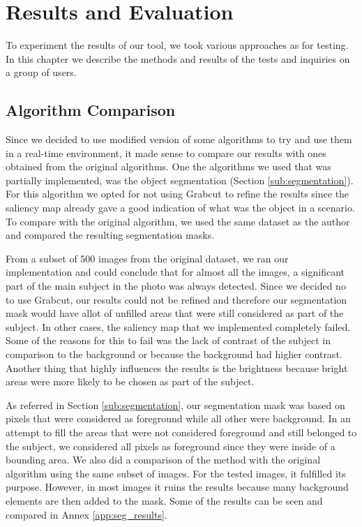 \chapter{Results and Evaluation}
\label{cha:results}

To experiment the results of our tool, we took various approaches as for testing. In this chapter we describe the methods and results of the tests and inquiries on a group of users.

\section{Algorithm Comparison}

Since we decided to use modified version of some algorithms to try and use them in a real-time environment, it made sense to compare our results with ones obtained from the original algorithms. 
One the algorithms we used that was partially implemented, was the object segmentation (Section \ref{sub:segmentation}). For this algorithm we opted for not using Grabcut \cite{rother2004grabcut} to refine the results since the saliency map already gave a good indication of what was the object in a scenario.  To compare with the original algorithm, we used the same dataset as the author and compared the resulting segmentation masks.

From a subset of 500 images from the original dataset, we ran our implementation and could conclude that for almost all the images, a significant part of the main subject in the photo was always detected. Since we decided no to use Grabcut, our results could not be refined and therefore our segmentation mask would have allot of unfilled areas that were still considered as part of the subject. In other cases, the saliency map that we implemented completely failed. Some of the reasons for this to fail was the lack of contrast of the subject in comparison to the background or because the background had higher contrast. Another thing that highly influences the results is the brightness because bright areas were more likely to be chosen as part of the subject.

As referred in Section \ref{sub:segmentation}, our segmentation mask was based on pixels that were considered as foreground while all other were background. In an attempt to fill the areas that were not considered foreground and still belonged to the subject, we considered all pixels as foreground since they were inside of a bounding area. We also did a comparison of the method with the original algorithm using the same subset of images. 
For the tested images, it fulfilled its purpose. However, in most images it ruins the results because many background elements are then added to the mask. Some of the results can be seen and compared in Annex \ref{app:seg_results}.



